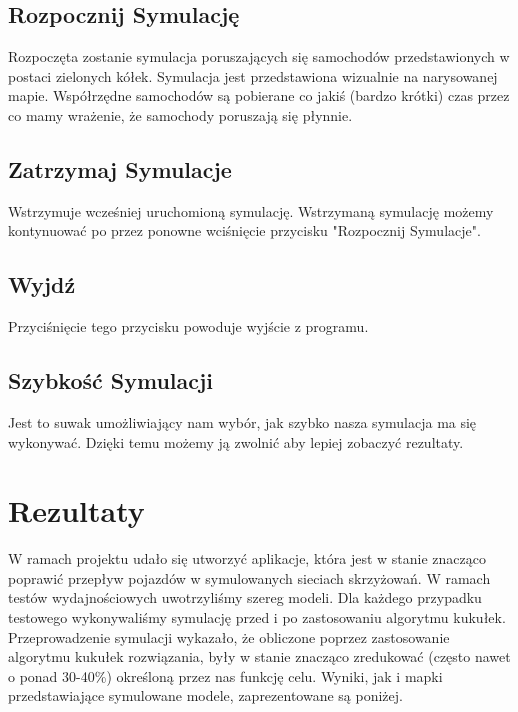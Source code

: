 \documentclass{article}
\begin{document}
\subsection{Rozpocznij Symulację}
    Rozpoczęta zostanie symulacja poruszających się samochodów przedstawionych w postaci zielonych kółek. Symulacja jest przedstawiona wizualnie na narysowanej mapie. Współrzędne samochodów są pobierane co jakiś (bardzo krótki) czas przez co mamy wrażenie, że samochody poruszają się płynnie.

\subsection{Zatrzymaj Symulacje}
    Wstrzymuje wcześniej uruchomioną symulację. Wstrzymaną symulację możemy kontynuować po przez ponowne wciśnięcie przycisku "Rozpocznij Symulacje".

\subsection{Wyjdź}
    Przyciśnięcie tego przycisku powoduje wyjście z programu.

\subsection{Szybkość Symulacji}
    Jest to suwak umożliwiający nam wybór, jak szybko nasza symulacja ma się wykonywać. Dzięki temu możemy ją zwolnić aby lepiej zobaczyć rezultaty.

\section{Rezultaty}

W ramach projektu udało się utworzyć aplikacje, która jest w stanie znacząco poprawić przepływ pojazdów w symulowanych sieciach skrzyżowań. W ramach testów wydajnościowych uwotrzyliśmy szereg modeli. Dla każdego przypadku testowego wykonywaliśmy symulację przed i po zastosowaniu algorytmu kukułek. Przeprowadzenie symulacji wykazało, że obliczone poprzez zastosowanie algorytmu kukułek rozwiązania, były w stanie znacząco zredukować (często nawet o ponad 30-40\%) określoną przez nas funkcję celu. Wyniki, jak i mapki przedstawiające symulowane modele, zaprezentowane są poniżej.
\end{document}

